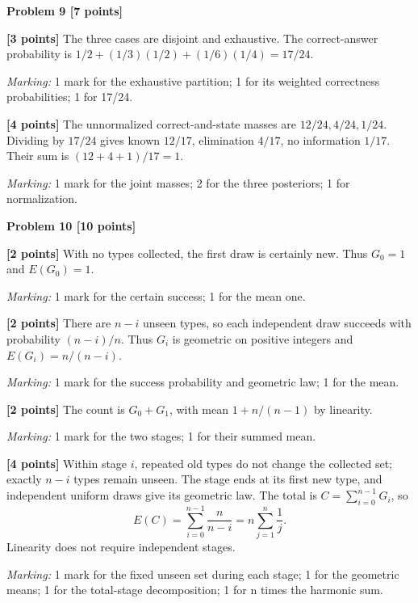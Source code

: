 \documentclass[12pt,letterpaper]{article}
\newcommand{\problemheading}[2][5\baselineskip]{\Needspace{#1}\par\noindent\hspace*{-0.625in}\textbf{#2}\par\nobreak\vspace{0.3em}}
\begin{document}
\vspace{0.65em}
\problemheading[\dimexpr 3\baselineskip+4\baselineskip\relax]{Problem 9 [7 points]}
\begin{description}[font=\normalfont,leftmargin=1.2em,labelsep=0.4em]
\item[(a)] \textbf{[3 points]} The three cases are disjoint and exhaustive. The correct-answer probability is $1/2+(1/3)(1/2)+(1/6)(1/4)=17/24$.
\par\textit{Marking:} 1 mark for the exhaustive partition; 1 for its weighted correctness probabilities; 1 for 17/24.
\item[(b)] \textbf{[4 points]} The unnormalized correct-and-state masses are $12/24,4/24,1/24$. Dividing by $17/24$ gives known $12/17$, elimination $4/17$, no information $1/17$. Their sum is $(12+4+1)/17=1$.
\par\textit{Marking:} 1 mark for the joint masses; 2 for the three posteriors; 1 for normalization.
\end{description}
\vspace{0.65em}
\problemheading[\dimexpr 3\baselineskip+4\baselineskip\relax]{Problem 10 [10 points]}
\begin{description}[font=\normalfont,leftmargin=1.2em,labelsep=0.4em]
\item[(a)] \textbf{[2 points]} With no types collected, the first draw is certainly new. Thus $G_0=1$ and $E(G_0)=1$.
\par\textit{Marking:} 1 mark for the certain success; 1 for the mean one.
\item[(b)] \textbf{[2 points]} There are $n-i$ unseen types, so each independent draw succeeds with probability $(n-i)/n$. Thus $G_i$ is geometric on positive integers and $E(G_i)=n/(n-i)$.
\par\textit{Marking:} 1 mark for the success probability and geometric law; 1 for the mean.
\item[(c)] \textbf{[2 points]} The count is $G_0+G_1$, with mean $1+n/(n-1)$ by linearity.
\par\textit{Marking:} 1 mark for the two stages; 1 for their summed mean.
\item[(d)] \textbf{[4 points]} Within stage $i$, repeated old types do not change the collected set; exactly $n-i$ types remain unseen. The stage ends at its first new type, and independent uniform draws give its geometric law. The total is $C=\sum_{i=0}^{n-1}G_i$, so\[E(C)=\sum_{i=0}^{n-1}\frac{n}{n-i}=n\sum_{j=1}^n\frac1j.\]Linearity does not require independent stages.
\par\textit{Marking:} 1 mark for the fixed unseen set during each stage; 1 for the geometric means; 1 for the total-stage decomposition; 1 for n times the harmonic sum.
\end{description}
\end{document}
